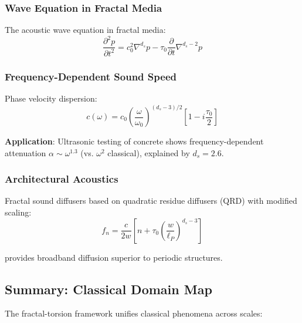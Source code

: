 \subsubsection{Wave Equation in Fractal Media}

The acoustic wave equation in fractal media:
\begin{equation}
    \frac{\partial^2 p}{\partial t^2} = c_0^2 \nabla^{d_s} p - \tau_0 \frac{\partial}{\partial t} \nabla^{d_s-2} p
\end{equation}

\subsubsection{Frequency-Dependent Sound Speed}

Phase velocity dispersion:
\begin{equation}
    c(\omega) = c_0 \left(\frac{\omega}{\omega_0}\right)^{(d_s-3)/2} \left[1 - i \frac{\tau_0}{2}\right]
\end{equation}

\textbf{Application}: Ultrasonic testing of concrete shows frequency-dependent attenuation $\alpha \sim \omega^{1.3}$ (vs. $\omega^2$ classical), explained by $d_s = 2.6$.

\subsubsection{Architectural Acoustics}

Fractal sound diffusers based on quadratic residue diffusers (QRD) with modified scaling:
\begin{equation}
    f_n = \frac{c}{2w} \left[n + \tau_0 \left(\frac{w}{\ell_P}\right)^{d_s-3}\right]
\end{equation}

provides broadband diffusion superior to periodic structures.

\subsection{Summary: Classical Domain Map}

The fractal-torsion framework unifies classical phenomena across scales:

